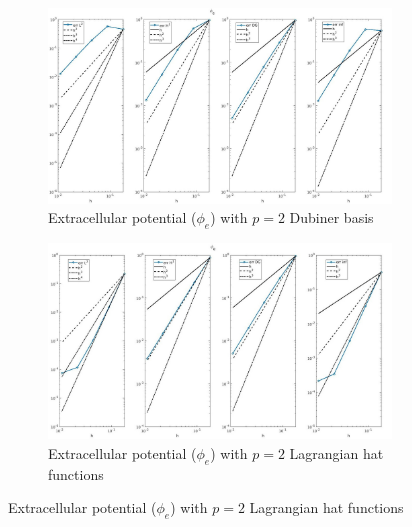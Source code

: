\documentclass[a4paper,11pt]{article}
\begin{document}
\begin{figure}[H]
\caption{Comparison of the extracellular potential ($\phi_e$)}
\label{phie_2}
\begin{subfigure}{\textwidth}
\begin{center}
\includegraphics[width = \textwidth]{./errors/D2_Phie_1.jpg}
\caption{Extracellular potential ($\phi_e$) with $p=2$ Dubiner basis}
\end{center}
\end{subfigure}
\begin{subfigure}{\textwidth}
\begin{center}
\includegraphics[width =\textwidth]{./errors/P2_Phie_1.jpg}
\caption{Extracellular potential ($\phi_e$) with $p=2$ Lagrangian hat functions}
\end{center}
\end{subfigure}
\end{figure}
\newpage
\end{document}
